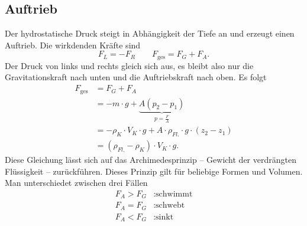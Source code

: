 \documentclass[a4paper,12pt]{article}
\begin{document}
\subsection{Auftrieb}
Der hydrostatische Druck steigt in Abhängigkeit der Tiefe an und erzeugt einen Auftrieb. Die wirkdenden Kräfte sind
\[ 
        F_L=-F_R\qquad F_{\text{ges}}=F_G+F_A
.\] 
Der Druck von links und rechts gleich sich aus, es bleibt also nur die Gravitationskraft nach unten und die Auftriebskraft nach oben. Es folgt
\begin{align*}
        F_{\text{ges}}&=F_G+F_A\\
                      &=-m\cdot g+\underbrace{A\left(p_2-p_1\right)}_{p=\tfrac{F}{A}}\\
                      &=-\rho _K\cdot V_K\cdot g+A\cdot \rho _{Fl.}\cdot g\cdot \left(z_2-z_1\right)\\
                      &=\left(\rho _{Fl.}-\rho _K\right)\cdot V_K\cdot g
.\end{align*}
Diese Gleichung lässt sich auf das Archimedesprinzip -- Gewicht der verdrängten Flüssigkeit -- zurückführen. Dieses Prinzip gilt für beliebige Formen und Volumen. Man unterschiedet zwischen drei Fällen
\begin{align*}
        F_A>F_G&:\text{schwimmt}\\
        F_A=F_G&:\text{schwebt}\\
        F_A<F_G&:\text{sinkt}
\end{align*}
\end{document}
